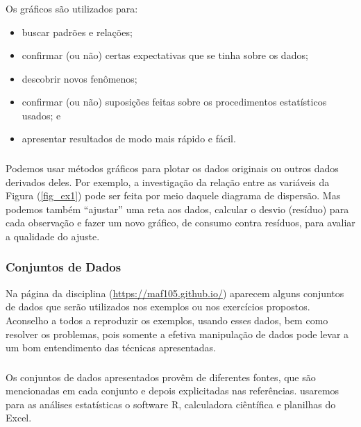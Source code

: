 \documentclass[14pt,aspectratio=1610]{beamer}
\begin{document}
\begin{frame}{}
\frametitle{}
\begin{block}{}
\justifying
Os gráficos são utilizados para:
\begin{itemize}
\item buscar padrões e relações;\pause
\item confirmar (ou não) certas expectativas que se tinha sobre os dados;\pause
\item descobrir novos fenômenos;\pause
\item confirmar (ou não) suposições feitas sobre os procedimentos estatísticos usados; e\pause
\item apresentar resultados de modo mais rápido e fácil.
\end{itemize}
\end{block}
\end{frame}

\begin{frame}{}
\frametitle{}
\begin{block}{}
\justifying
Podemos usar métodos gráficos para plotar os dados originais ou outros dados derivados
deles. Por exemplo, a investigação da relação entre as variáveis da Figura (\ref{fig_ex1}) pode ser feita por meio daquele diagrama de dispersão. Mas podemos também “ajustar” uma reta aos dados, calcular o desvio (resíduo) para cada observação e fazer um novo gráfico, de consumo contra resíduos, para avaliar a qualidade do ajuste.
\end{block}
\end{frame}

\begin{frame}{}
\frametitle{Conjuntos de Dados}
\begin{block}{}
\justifying
Na página da disciplina (\url{https://maf105.github.io/}) aparecem alguns conjuntos de dados que serão utilizados nos exemplos ou nos exercícios propostos. Aconselho a todos a reproduzir os exemplos, usando esses dados, bem como resolver os problemas, pois somente a efetiva manipulação de dados pode levar a um bom entendimento das técnicas apresentadas.
\end{block}
\end{frame}

\begin{frame}{}
\frametitle{}
\begin{block}{}
\justifying
Os conjuntos de dados apresentados provêm de diferentes fontes, que são mencionadas
em cada conjunto e depois explicitadas nas referências. usaremos para as análises estatísticas o software R, calculadora ciêntífica e planilhas do Excel. 
\end{block}
\end{frame}
\end{document}
